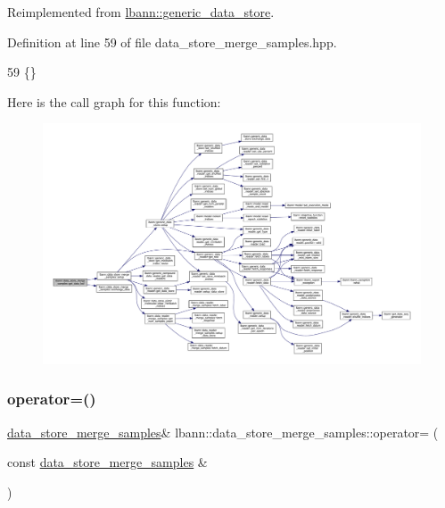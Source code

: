 Reimplemented from \hyperlink{classlbann_1_1generic__data__store_a2abb3d0327b528d36e23fcef9b937798}{lbann\+::generic\+\_\+data\+\_\+store}.



Definition at line 59 of file data\+\_\+store\+\_\+merge\+\_\+samples.\+hpp.


\begin{DoxyCode}
59 \{\}
\end{DoxyCode}
Here is the call graph for this function\+:\nopagebreak
\begin{figure}[H]
\begin{center}
\leavevmode
\includegraphics[width=350pt]{classlbann_1_1data__store__merge__samples_a8b81d947c1f05c38b7f979ce7e3cef97_cgraph}
\end{center}
\end{figure}
\mbox{\label{classlbann_1_1data__store__merge__samples_a8723206ebe4ed829fbf968340ef71d8f}} 
\subsubsection{\texorpdfstring{operator=()}{operator=()}}
{\footnotesize\ttfamily \hyperlink{classlbann_1_1data__store__merge__samples}{data\+\_\+store\+\_\+merge\+\_\+samples}\& lbann\+::data\+\_\+store\+\_\+merge\+\_\+samples\+::operator= (\begin{DoxyParamCaption}\item[{const \hyperlink{classlbann_1_1data__store__merge__samples}{data\+\_\+store\+\_\+merge\+\_\+samples} \&}]{ }\end{DoxyParamCaption})\hspace{0.3cm}{\ttfamily [default]}}



